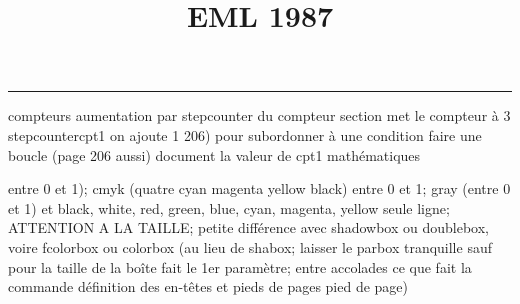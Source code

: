 \documentclass[11pt]{article}%
\title{\bf \vspace{-2cm} EML 1987} %
\author{} %
\date{} %
\renewcommand{\headrulewidth}{0pt}%
\renewcommand{\footrulewidth}{0.4pt}%
\begin{document}
\maketitle %
\vspace{-1.4cm}\hrule %
\thispagestyle{fancy}

\vspace*{.2cm}



compteurs%
aumentation par stepcounter du compteur section%
met le compteur à 3%
stepcounter{cpt1} on ajoute 1%
206) pour subordonner à une condition %
faire une boucle (page 206 aussi) %
document la valeur de cpt1 
mathématiques\newcommand{\ch}{\operatorname{ch}} 
\newcommand{\sh}{\operatorname{sh}}
\renewcommand{\tanh}{\operatorname{th}}
\renewcommand{\sinh}{\operatorname{sh}}
\renewcommand{\cosh}{\operatorname{ch}}
\newcommand{\argsh}{\operatorname{argsh}}
\newcommand{\argch}{\operatorname{argch}}
\newcommand{\argth}{\operatorname{argth}}
\newcommand{\ker}{\operatorname{Ker}}
\renewcommand{\im}{\operatorname{Im}}
\newcommand{\rg}{\operatorname{rg}}
\newcommand{\Id}{\operatorname{Id}}
\newcommand{\id}{\operatorname{id}}
\renewcommand{\leq}{\leq}
\renewcommand{\geq}{\geq }

entre 0 et 1); cmyk (quatre cyan magenta yellow black) entre 0 et 1;
gray (entre 0 et 1) et black, white, red, green, blue, cyan, magenta,
yellow%
seule ligne; ATTENTION A LA TAILLE; petite différence avec shadowbox ou
doublebox, voire fcolorbox ou colorbox (au lieu de shabox; laisser le
parbox tranquille sauf pour la taille de la boîte
\newcommand{\Tbox}[1]{\begin{center} \shabox{\parbox{0.6
\linewidth}{#1}} \end{center}} %
fait le 1er paramètre; entre accolades ce que fait la commande
définition des en-têtes et pieds de pages\pagestyle{fancy}
\chead{}
\rfoot[ \ \thepage]{\thepage}
\cfoot{}
\lfoot{}
\thispagestyle{fancy} %
pied de page)\renewcommand{\footrulewidth}{0.4pt}
\renewcommand{\headrulewidth}{0.4pt}
\end{document}
